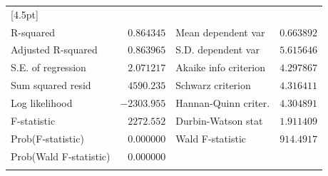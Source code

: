 \documentclass[12pt]{article}
\numberwithin{equation}{section} %
\begin{document}
\begin{table}[H]
\begin{tabular}{lrrrr}
[4.5pt] \hline \\ [-4.5pt]
\multicolumn{1}{l}{R-squared}&\multicolumn{1}{r}{$0.864345$}&\multicolumn{2}{l}{Mean dependent var}&\multicolumn{1}{r}{$0.663892$}\\
\multicolumn{1}{l}{Adjusted R-squared}&\multicolumn{1}{r}{$0.863965$}&\multicolumn{2}{l}{S.D. dependent var}&\multicolumn{1}{r}{$5.615646$}\\
\multicolumn{1}{l}{S.E. of regression}&\multicolumn{1}{r}{$2.071217$}&\multicolumn{2}{l}{Akaike info criterion}&\multicolumn{1}{r}{$4.297867$}\\
\multicolumn{1}{l}{Sum squared resid}&\multicolumn{1}{r}{$4590.235$}&\multicolumn{2}{l}{Schwarz criterion}&\multicolumn{1}{r}{$4.316411$}\\
\multicolumn{1}{l}{Log likelihood}&\multicolumn{1}{r}{$-2303.955$}&\multicolumn{2}{l}{Hannan-Quinn criter.}&\multicolumn{1}{r}{$4.304891$}\\
\multicolumn{1}{l}{F-statistic}&\multicolumn{1}{r}{$2272.552$}&\multicolumn{2}{l}{Durbin-Watson stat}&\multicolumn{1}{r}{$1.911409$}\\
\multicolumn{1}{l}{Prob(F-statistic)}&\multicolumn{1}{r}{$0.000000$}&\multicolumn{2}{l}{Wald F-statistic}&\multicolumn{1}{r}{$914.4917$}\\
\multicolumn{1}{l}{Prob(Wald F-statistic)}&\multicolumn{1}{r}{$0.000000$}&\multicolumn{1}{c}{}&\multicolumn{1}{c}{}&\multicolumn{1}{c}{}\\
[4.5pt] \hline \\ [-4.5pt]
\end{tabular}
\end{table}
\end{document}
